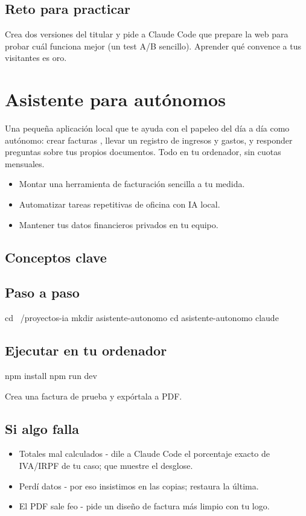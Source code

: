 \documentclass[11pt,a4paper]{book}
\begin{document}
\section{Reto para practicar}
Crea dos versiones del titular y pide a Claude Code que prepare la web para probar cuál funciona mejor (un test A/B sencillo). Aprender qué convence a tus visitantes es oro.

\chapter{Asistente para autónomos}
Una pequeña aplicación local que te ayuda con el papeleo del día a día como autónomo: crear facturas , llevar un registro de ingresos y gastos, y responder preguntas sobre tus propios documentos. Todo en tu ordenador, sin cuotas mensuales.

\begin{itemize}\item Montar una herramienta de facturación sencilla a tu medida.\end{itemize}
\begin{itemize}\item Automatizar tareas repetitivas de oficina con IA local.\end{itemize}
\begin{itemize}\item Mantener tus datos financieros privados en tu equipo.\end{itemize}
\section{Conceptos clave}
\section{Paso a paso}
\begin{codebox}
cd ~/proyectos-ia
mkdir asistente-autonomo
cd asistente-autonomo
claude
\end{codebox}
\section{Ejecutar en tu ordenador}
\begin{codebox}
npm install
npm run dev
\end{codebox}
Crea una factura de prueba y expórtala a PDF.

\section{Si algo falla}
\begin{itemize}\item Totales mal calculados - dile a Claude Code el porcentaje exacto de IVA/IRPF de tu caso; que muestre el desglose.\end{itemize}
\begin{itemize}\item Perdí datos - por eso insistimos en las copias; restaura la última.\end{itemize}
\begin{itemize}\item El PDF sale feo - pide un diseño de factura más limpio con tu logo.\end{itemize}
\end{document}
